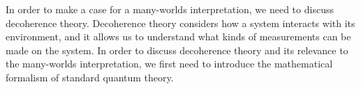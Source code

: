     In order to make a case for a many-worlds interpretation, we need to discuss decoherence theory. Decoherence theory considers how a system interacts with its environment, and it allows us to understand what kinds of measurements can be made on the system. In order to discuss decoherence theory and its relevance to the many-worlds interpretation, we first need to introduce the mathematical formalism of standard quantum theory.
   
